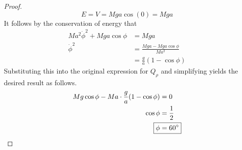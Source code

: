 \documentclass[../psets.tex]{subfiles}
\begin{document}
\begin{enumerate}
\begin{proof}
\begin{equation*}
            E = V = Mga\cos(0) = Mga
        \end{equation*}
        It follows by the conservation of energy that
        \begin{align*}
            Ma^2\dot{\phi}^2+Mga\cos\phi &= Mga\\
            \dot{\phi}^2 &= \frac{Mga-Mga\cos\phi}{Ma^2}\\
            &= \frac{g}{a}(1-\cos\phi)
        \end{align*}
        Substituting this into the original expression for $Q_\rho$ and simplifying yields the desired result as follows.
        \begin{align*}
            Mg\cos\phi-Ma\cdot\frac{g}{a}(1-\cos\phi) &= 0\\
            \cos\phi &= \frac{1}{2}\\
            \Aboxed{\phi &= \ang{60}}
        \end{align*}
    \end{proof}
\end{enumerate}
\end{document}
